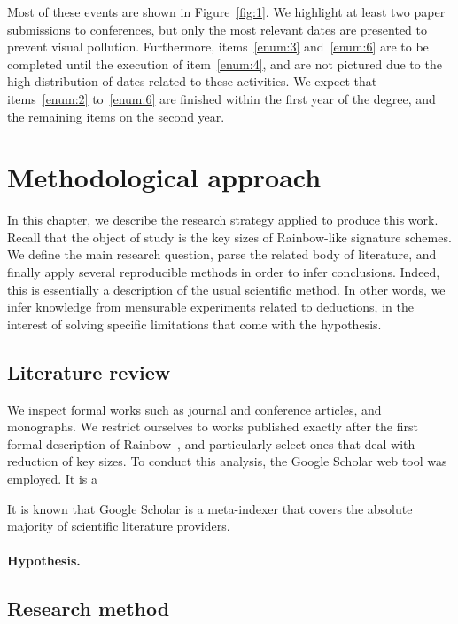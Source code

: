 \documentclass[openright]{report}
\begin{document}
Most of these events are shown in Figure~\ref{fig:1}. We highlight at least two paper submissions to conferences, but only the most relevant dates are presented to prevent visual pollution. Furthermore, items~\ref{enum:3} and~\ref{enum:6} are to be completed until the execution of item~\ref{enum:4}, and are not pictured due to the high distribution of dates related to these activities. We expect that items~\ref{enum:2} to~\ref{enum:6} are finished within the first year of the degree, and the remaining items on the second year.

\chapter{Methodological approach}

In this chapter, we describe the research strategy applied to produce this work. Recall that the object of study is the key sizes of Rainbow-like signature schemes. We define the main research question, parse the related body of literature, and finally apply several reproducible methods in order to infer conclusions. Indeed, this is essentially a description of the usual scientific method. In other words, we infer knowledge from mensurable experiments related to deductions, in the interest of solving specific limitations that come with the hypothesis.

\section{Literature review}

We inspect formal works such as journal and conference articles, and monographs. We restrict ourselves to works published exactly after the first formal description of Rainbow~\cite{}, and particularly select ones that deal with reduction of key sizes. To conduct this analysis, the Google Scholar web tool was employed. It is a 


It is known that Google Scholar is a meta-indexer that covers the absolute majority of scientific literature providers. 

\subsubsection{Hypothesis.} 

\section{Research method}
\end{document}
